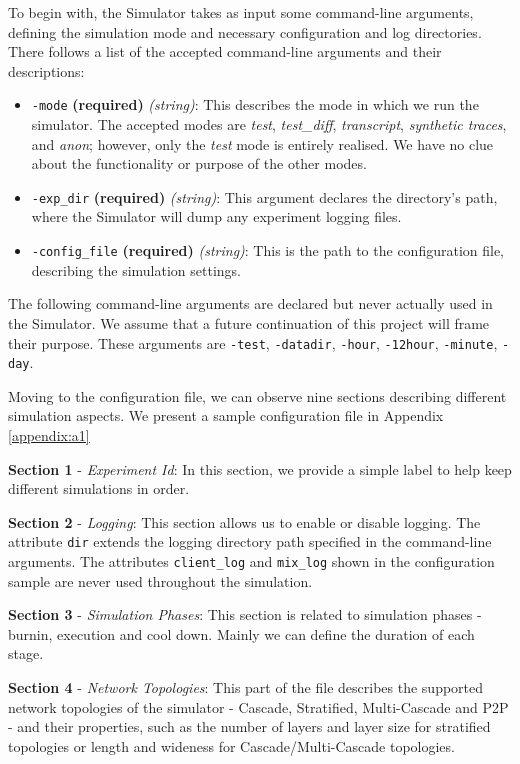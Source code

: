 \documentclass[logo,msc,cyber]{infthesis}   %
\begin{document}
To begin with, the Simulator takes as input some command-line arguments,
defining the simulation mode and necessary configuration and log directories.
There follows a list of the accepted command-line arguments and their
descriptions:

\begin{itemize}
    \item[] \texttt{-mode} \textbf{(required)} \textit{(string)}: This describes
    the mode in which we run the simulator. The accepted modes are \emph{test},
    \emph{test\_diff}, \emph{transcript}, \emph{synthetic traces}, and
    \emph{anon}; however, only the \emph{test} mode is entirely realised. We have no
    clue about the functionality or purpose of the other modes.
    \item[] \texttt{-exp\_dir} \textbf{(required)} \textit{(string)}: This argument
    declares the directory's path, where the Simulator will dump any experiment
    logging files.
    \item[] \texttt{-config\_file} \textbf{(required)} \textit{(string)}: This is
    the path to the configuration file, describing the simulation settings.
 \end{itemize}

The following command-line arguments are declared but never actually used in the
Simulator. We assume that a future continuation of this project will frame their
purpose. These arguments are \texttt{-test}, \texttt{-datadir}, \texttt{-hour},
\texttt{-12hour}, \texttt{-minute}, \texttt{-day}.

Moving to the configuration file, we can observe nine sections describing
different simulation aspects. We present a sample configuration file in Appendix \ref{appendix:a1}

\textbf{Section 1} - \emph{Experiment Id}: In this section, we provide a simple
label to help keep different simulations in order.
    
\textbf{Section 2} - \emph{Logging}: This section allows us to enable or disable
logging. The attribute \texttt{dir} extends the logging directory path specified
in the command-line arguments. The attributes \texttt{client\_log} and
\texttt{mix\_log} shown in the configuration sample are never used throughout
the simulation.

\textbf{Section 3} - \emph{Simulation Phases}:  This section is related to
simulation phases - burnin, execution and cool down. Mainly we can define the
duration of each stage.

\textbf{Section 4} - \emph{Network Topologies}:  This part of the file describes
the supported network topologies of the simulator - Cascade, Stratified,
Multi-Cascade and P2P - and their properties, such as the number of layers and
layer size for stratified topologies or length and wideness for
Cascade/Multi-Cascade topologies.
\end{document}
